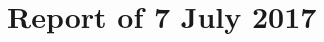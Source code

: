 \documentclass[aspectratio=169, xcolor=table]{beamer}
\begin{document}





\part{Report of 7 July 2017}



\end{document}

